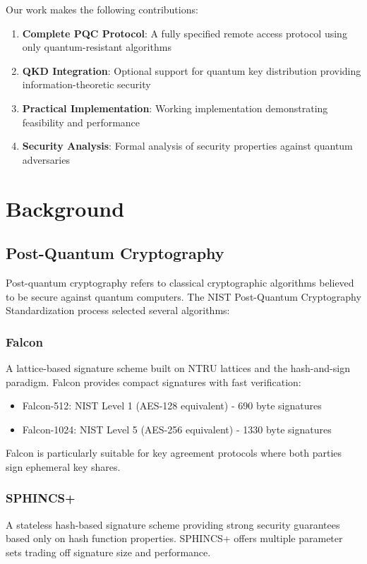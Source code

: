 \documentclass[11pt,a4paper]{article}
\begin{document}
Our work makes the following contributions:

\begin{enumerate}
    \item \textbf{Complete PQC Protocol}: A fully specified remote access protocol using only quantum-resistant algorithms
    \item \textbf{QKD Integration}: Optional support for quantum key distribution providing information-theoretic security
    \item \textbf{Practical Implementation}: Working implementation demonstrating feasibility and performance
    \item \textbf{Security Analysis}: Formal analysis of security properties against quantum adversaries
\end{enumerate}

\section{Background}

\subsection{Post-Quantum Cryptography}

Post-quantum cryptography refers to classical cryptographic algorithms believed to be secure against quantum computers. The NIST Post-Quantum Cryptography Standardization process selected several algorithms:

\subsubsection{Falcon}
A lattice-based signature scheme built on NTRU lattices and the hash-and-sign paradigm. Falcon provides compact signatures with fast verification:
\begin{itemize}
    \item Falcon-512: NIST Level 1 (AES-128 equivalent) - 690 byte signatures
    \item Falcon-1024: NIST Level 5 (AES-256 equivalent) - 1330 byte signatures
\end{itemize}
Falcon is particularly suitable for key agreement protocols where both parties sign ephemeral key shares.

\subsubsection{SPHINCS+}
A stateless hash-based signature scheme providing strong security guarantees based only on hash function properties. SPHINCS+ offers multiple parameter sets trading off signature size and performance.
\end{document}
